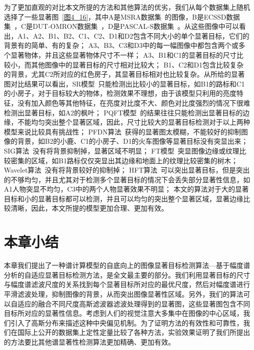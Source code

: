 为了更加直观的对比本文所提的方法和其他算法的优劣，我们从每个数据集上随机选择了一些显著图~\ref{图4_16}，其中A是MSRA数据集~\cite{LiuTieCVPR2007Learning}的图像，B是ECSSD数据集~\cite{YanQiongCVPR2013Hierarchical}，C是DUT-OMRON数据集~\cite{YangChuanCVPR2013Manifold}，D是PASCAL-S数据集~\cite{LiYinCVPR2014Secrets}。从这些图像中可以看出，A1、A2、B1、B2、C1、C2、D1和D2包含不同大小的单个显著目标，它们的背景有的简单、有的复杂； A3、B3、C3和D3中的每一幅图像中都包含两个或多个显著物体，并且这些显著物体尺寸不一样； A3、B1和C1的显著目标的尺寸比较小，而其他图像中的显著目标的尺寸相对比较大； B1、C2和D1包含比较复杂的背景，尤其C2所对应的红色房子，其显著目标相对也比较复杂。从所给的显著图对比结果可以看出，SR模型~\cite{HouXiaodiCVPR2007Residual}只能检测出比较小的显著目标，如B1的路标和C1的小房子，对于目标较大的物体，检测效果不理想，由于该模型只利用的亮度特征，没有加入颜色等其他特征，在亮度对比度不大、颜色对比度强烈的情况下很难检测出显著目标，如A2的枫叶； PQFT模型~\cite{GuoChenleiCVPR2008Spatio}的结果往往只能检测出显著目标的边缘，不能均匀突出整个显著区域，因此，尺寸比较大的显著目标检测对于以上两种模型来说比较具有挑战性； PFDN算法~\cite{BianCognNeurodyn2010Visual}获得的显著图太模糊，不能较好的抑制图像的背景，如B2的小鹿、C1的小房子、D1的火车图像等显著目标没有突显出来； SIG算法~\cite{HouXiaodiTPAMI2012Signature}没有将背景抑制掉，显著区域不明显； FT模型~\cite{AchantaCVPR2009Frequency}突显图像边缘或纹理比较密集的区域，如B1路标仅仅突显出其边缘和地面上的纹理比较密集的树木； Wavelet算法~\cite{ImamogluTMM2013wavelet}没有将背景较好的抑制掉； HFT算法~\cite{LiJianTPAMI2013Scale}可以突出显著目标，但是突出的不够均匀，并且尤其对于检测多个显著目标的情况下会丢失部分显著性信息，如A1人物突显不均匀，C3中的两个人物显著效果不明显； 本文的算法对于大的显著目标和小的显著目标都可以检测，并且可以均匀的突出整个显著区域，显著边缘比较清晰，因此，本文所提的模型更加合理、更加有效。

\section{本章小结}
\label{4_3}

本章我们提出了一种谱计算模型的自底向上的图像显著目标检测算法---基于幅度谱分析的自适应显著目标检测方法，是全文最主要的部分。我们利用显著目标的尺寸与幅度谱滤波尺度的关系找到每个显著目标所对应的最优尺度，然后对幅度谱进行平滑滤波处理，抑制图像的背景，从而突出图像显著性区域。另外，我们的算法可以自适应的融合不同尺度高斯滤波器滤波处理得到的显著图，这些显著图包含不同目标所对应的显著性信息。考虑到人们的视觉注意大多集中在图像的中心区域，我们引入了高斯分布来描述这种中央偏见机制。为了证明方法的有效性和可靠性，我们在国际上公开的数据集上定性定量比较了各种方法，实验效果证明了我们所提出的方法要比其他谱显著性检测算法更加精确、更加有效。

















